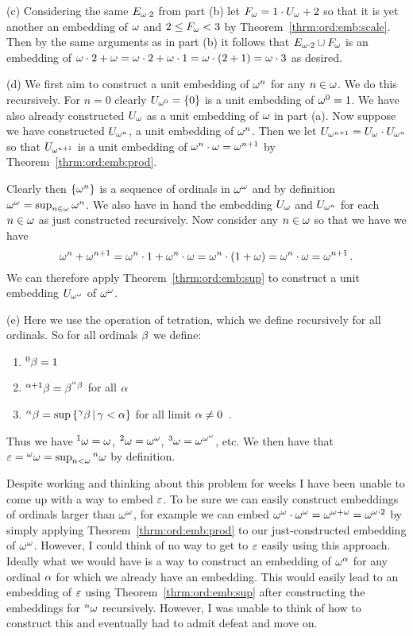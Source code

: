 {  (c) Considering the same $E_{\omega \cdot 2}$ from part (b) let $F_\omega = 1 \cdot U_\omega + 2$ so that it is yet another an embedding of $\omega$ and $2 \leq F_\omega < 3$ by Theorem~\ref{thrm:ord:emb:scale}.
  Then by the same arguments as in part (b) it follows that $E_{\omega \cdot 2} \cup F_\omega$ is an embedding of $\omega \cdot 2 + \omega = \omega \cdot 2 + \omega \cdot 1 = \omega \cdot (2 + 1) = \omega \cdot 3$ as desired.

  \def\Uww{U_{\w^\w}}

  (d) We first aim to construct a unit embedding of $\omega^n$ for any $n \in \omega$.
  We do this recursively.
  For $n=0$ clearly $U_{\omega^0} = \left\{ 0 \right\}$ is a unit embedding of $\omega^0 = 1$.
  We have also already constructed $U_\omega$ as a unit embedding of $\omega$ in part (a).
  Now suppose we have constructed $U_{\omega^n}$, a unit embedding of $\omega^n$.
  Then we let $U_{\omega^{n+1}} = U_\omega \cdot U_{\omega^n}$ so that $U_{\omega^{n+1}}$ is a unit embedding of $\omega^n \cdot \omega = \omega^{n+1}$ by Theorem~\ref{thrm:ord:emb:prod}.
  
  Clearly then $\left\{ \omega^n \right\}$ is a sequence of ordinals in $\omega^\omega$ and by definition $\omega^\omega = \sup_{n \in \omega} \omega^n$.
  We also have in hand the embedding $U_\omega$ and $U_{\omega^n}$ for each $n \in \omega$ as just constructed recursively.
  Now consider any $n \in \omega$ so that we have we have
  $$
  \omega^n + \omega^{n+1} = \omega^n \cdot 1 + \omega^n \cdot \omega = \omega^n \cdot (1 + \omega) = \omega^n \cdot \omega = \omega^{n+1} \,.
  $$
  We can therefore apply Theorem~\ref{thrm:ord:emb:sup} to construct a unit embedding $U_{\omega^\omega}$ of $\omega^\omega$.

  (e) Here we use the operation of tetration, which we define recursively for all ordinals.
  So for all ordinals $\beta$ we define:
  \begin{enumerate}
  \item ${^{0}\beta} = 1$
  \item ${^{\alpha+1}\beta} = \beta^{{^{\alpha}\beta}}$ for all $\alpha$
  \item ${^{\alpha}\beta} = \sup\left\{ {^{\gamma}\beta} \,|\, \gamma < \alpha \right\}$ for all limit $\alpha \neq 0$ \,.
  \end{enumerate}
  Thus we have ${^{1}\omega} = \omega$, ${^{2}\omega} = \omega^\omega$, ${^{3}\omega} = \omega^{\omega^\omega}$, etc.
  We then have that $\varepsilon = {^{\omega}\omega} = \sup_{n < \omega} {^{n}\omega}$ by definition.

  Despite working and thinking about this problem for weeks I have been unable to come up with a way to embed $\varepsilon$.
  To be sure we can easily construct embeddings of ordinals larger than $\omega^\omega$, for example we can embed $\omega^\omega \cdot \omega^\omega = \omega^{\omega + \omega} = \omega^{\omega \cdot 2}$ by simply applying Theorem~\ref{thrm:ord:emb:prod} to our just-constructed embedding of $\omega^\omega$.
  However, I could think of no way to get to $\varepsilon$ easily using this approach.
  Ideally what we would have is a way to construct an embedding of $\omega^\alpha$ for any ordinal $\alpha$ for which we already have an embedding.
  This would easily lead to an embedding of $\varepsilon$ using Theorem~\ref{thrm:ord:emb:sup} after constructing the embeddings for ${^{n}\omega}$ recursively.
  However, I was unable to think of how to construct this and eventually had to admit defeat and move on.
}

